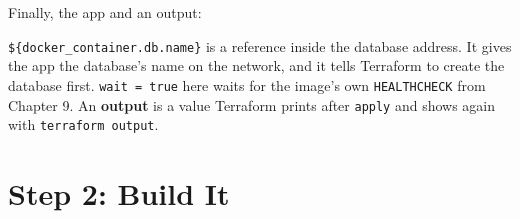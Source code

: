 
Finally, the app and an output:

\begin{codeblock}

\begin{Shaded}
\begin{Highlighting}[]
\NormalTok{  env = [}
\NormalTok{  ]}

\NormalTok{  \}}

\NormalTok{  \}}
\NormalTok{\}}

\NormalTok{\}}
\end{Highlighting}
\end{Shaded}

\end{codeblock}

\texttt{\$\{docker\_}\allowbreak{}\texttt{container.}\allowbreak{}\texttt{db.}\allowbreak{}\texttt{name\}} is a reference inside the database address. It gives the app the database's name on the network, and it tells Terraform to create the database first. \texttt{wait\ =\ true} here waits for the image's own \texttt{HEALTHCHECK} from Chapter 9. An \textbf{output} is a value Terraform prints after \texttt{apply} and shows again with \texttt{terraform\ output}.

\section{Step 2: Build It}\label{11-lab-rebuild-everything-from-code:step-2-build-it}

\begin{codeblock}

\begin{Shaded}
\begin{Highlighting}[]
 \OperatorTok{=}
\end{Highlighting}
\end{Shaded}

\end{codeblock}

